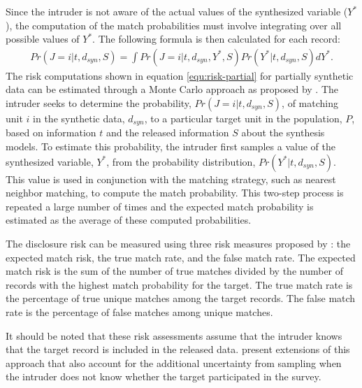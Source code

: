 Since the intruder is not aware of the actual values of the synthesized variable ($Y^{\ast}$), the computation of the match probabilities must involve integrating over all possible values of $Y^{\ast}$. The following formula is then calculated for each record:
\begin{align}
    \label{equ:risk-partial}
    Pr(J = i|t, d_{syn}, S)=\int Pr(J = i|t, d_{syn}, Y^*,S)Pr(Y^*|t, d_{syn}, S)dY^*.
\end{align}
The risk computations shown in equation \eqref{equ:risk-partial} for partially synthetic data can be estimated through a Monte Carlo approach as proposed by \citet{drechsler2010sampling}. The intruder seeks to determine the probability, $Pr(J = i|t, d_{syn}, S)$, of matching unit $i$ in the synthetic data, $d_{syn}$, to a particular target unit in the population, $P$, based on information $t$ and the released information $S$ about the synthesis models. To estimate this probability, the intruder first samples a value of the synthesized variable, $Y^{\ast}$, from the probability distribution, $Pr(Y^{\ast}|t,d_{syn},S)$. This value is used in conjunction with the matching strategy, such as nearest neighbor matching, to compute the match probability. This two-step process is repeated a large number of times and the expected match probability is estimated as the average of these computed probabilities.

The disclosure risk can be measured using three risk measures proposed by \citet{reiter2009estimating}: the expected match risk, the true match rate, and the false match rate. The expected match risk is the sum of the number of true matches divided by the number of records with the highest match probability for the target. The true match rate is the percentage of true unique matches among the target records. The false match rate is the percentage of false matches among unique matches.

It should be noted that these risk assessments assume that the intruder knows that the target record is included in the released data. \citet{drechsler2008accounting} present extensions of this approach that also account for the additional uncertainty from sampling when the intruder does not know whether the target participated in the survey.







